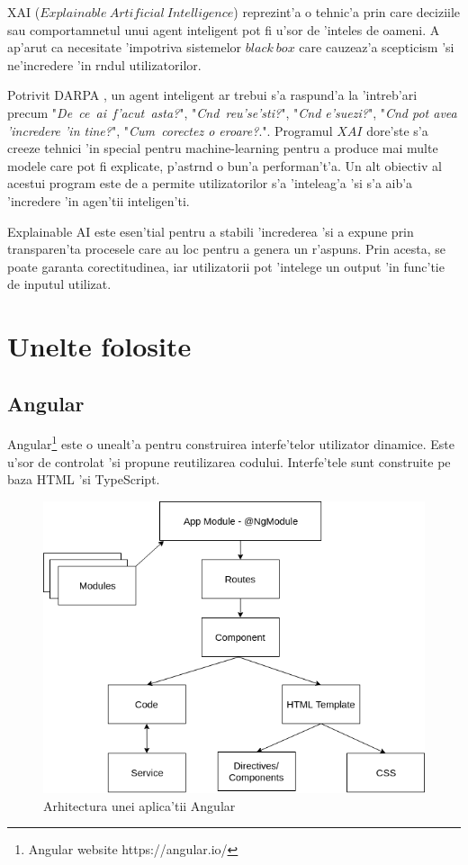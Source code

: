 \documentclass[12pt,a4paper,twoside]{report}
\begin{document}
XAI ($Explainable\ Artificial\ Intelligence$) reprezint'a o tehnic'a prin care deciziile sau comportamnetul unui agent inteligent pot fi u'sor de 'inteles de oameni. A ap'arut ca necesitate 'impotriva sistemelor $black\ box$ care cauzeaz'a scepticism 'si ne'incredere 'in r\ia ndul utilizatorilor.

Potrivit DARPA \cite{darpaXAI}, un agent inteligent ar trebui s'a raspund'a la 'intreb'ari precum 
"{\it De\ ce\ ai\ f'acut\ asta?}", 
"{\it C\ia nd\ reu'se'sti?}", 
"{\it C\ia nd e'suezi?}", 
"{\it C\ia nd pot avea 'incredere 'in tine?}", 
"{\it Cum\ corectez o eroare?}.". Programul $XAI$ dore'ste s'a creeze tehnici 'in special pentru machine-learning pentru a produce mai multe modele care pot fi explicate, p'astr\ia nd o bun'a performan't'a. Un alt obiectiv al acestui program este de a permite utilizatorilor s'a 'inteleag'a 'si s'a aib'a 'incredere 'in agen'tii inteligen'ti.

Explainable AI este esen'tial pentru a stabili 'increderea 'si a expune prin transparen'ta procesele care au loc pentru a genera un r'aspuns. Prin acesta, se poate garanta corectitudinea, iar utilizatorii pot 'intelege un output 'in func'tie de inputul utilizat.

\section{Unelte folosite}
\subsection{Angular}

Angular\footnote{Angular website https://angular.io/} este o unealt'a pentru construirea interfe'telor utilizator dinamice. Este u'sor de controlat 'si propune reutilizarea codului. Interfe'tele sunt construite pe baza HTML 'si TypeScript. 


\begin{figure}
    \centering
    \includegraphics[width = 0.6\linewidth]{img/angular_schema.png}
        \caption{Arhitectura unei aplica'tii Angular}
    \label{fig:ang}
\end{figure}
\end{document}
